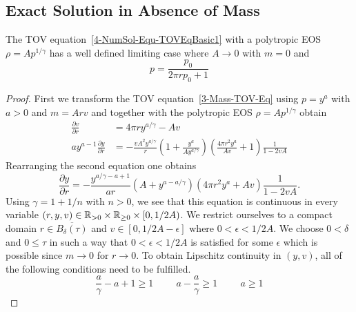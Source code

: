 \subsection{Exact \texorpdfstring{}{TOV} Solution in Absence of Mass}
\label{subsec:99-App-TOV-No-Mass}
\begin{theorem}
	The TOV equation~\ref{4-NumSol-Equ-TOVEqBasic1} with a polytropic EOS $\rho=Ap^{1/\gamma}$ has a well defined limiting case where $A\rightarrow0$ with $m=0$ and
	\begin{equation}
		p = \frac{p_0}{2\pi rp_0+1}
		\label{eq:99-App-TOV-No-Mass-Sol}
	\end{equation}
\end{theorem}
\begin{proof}
	First we transform the TOV equation~\ref{3-Mass-TOV-Eq} using $p=y^a$ with $a>0$ and $m=Arv$ and together with the polytropic EOS $\rho=Ap^{1/\gamma}$ obtain
	\begin{align}
		\frac{\partial v}{\partial r} &= 4\pi ry^{a/\gamma}-Av\\
		ay^{a-1}\frac{\partial y}{\partial r} &= -\frac{vA^2 y^{a/\gamma}}{r}\left(1+\frac{y^a}{Ay^{a/\gamma}}\right)\left(\frac{4\pi r^2 y^a}{Av} +1\right)\frac{1}{1-2vA}
		\label{tmp-label-2}
	\end{align}
	Rearranging the second equation one obtains
	\begin{equation}
		\frac{\partial y}{\partial r} = -\frac{y^{a/\gamma-a+1}}{ar}\left(A+y^{a-a/\gamma}\right)\left(4\pi r^2 y^a +Av\right)\frac{1}{1-2vA}.
		\label{eq:99-App-TOV-No-Mass-Transformed-TOV-Eq}
	\end{equation}
	Using $\gamma=1+1/n$ with $n>0$, we see that this equation is continuous in every variable $(r,y,v)\in\mathbb{R}_{>0}\times\mathbb{R}_{\geq0}\times[0,1/2A)$.
	We restrict ourselves to a compact domain $r\in \overline{B_{\delta}(\tau)}$ and $v\in[0,1/2A-\epsilon]$ where $0<\epsilon<1/2A$.
	We choose $0<\delta$ and $0\leq\tau$ in such a way that $0<\epsilon<1/2A$ is satisfied for some $\epsilon$ which is possible since $m\rightarrow0$ for $r\rightarrow0$.
	To obtain Lipschitz continuity in $(y,v)$, all of the following conditions need to be fulfilled.
	\begin{equation}
		\frac{a}{\gamma}-a+1 \geq 1 \hspace{1cm} a-\frac{a}{\gamma} \geq 1 \hspace{1cm} a \geq 1
		\label{eq:99-App-TOV-No-Mass-Parameter-Condition}

\end{equation}
\end{proof}
